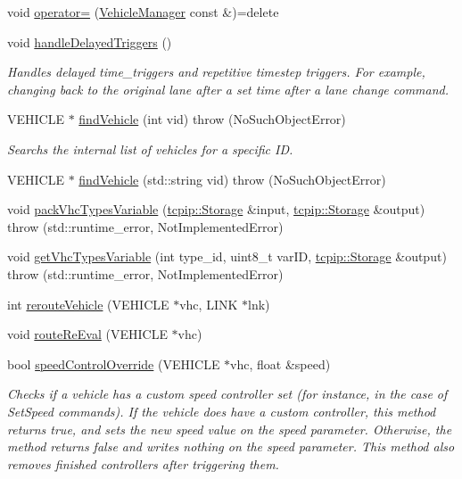 \begin{DoxyCompactItemize}
\item 
void \hyperlink{classtraci__api_1_1_vehicle_manager_a3e5ca16c51d63faee6a3a9eb3a4ffafa}{operator=} (\hyperlink{classtraci__api_1_1_vehicle_manager}{Vehicle\+Manager} const \&)=delete
\item 
void \hyperlink{classtraci__api_1_1_vehicle_manager_a4e656c9c9b434113e01331cf0b84babc}{handle\+Delayed\+Triggers} ()
\begin{DoxyCompactList}\small\item\em Handles delayed time\+\_\+triggers and repetitive timestep triggers. For example, changing back to the original lane after a set time after a lane change command. \end{DoxyCompactList}\item 
V\+E\+H\+I\+C\+LE $\ast$ \hyperlink{classtraci__api_1_1_vehicle_manager_a46fe50f2be4e9eb6df8f62b9a6e7aa53}{find\+Vehicle} (int vid)  throw (\+No\+Such\+Object\+Error)
\begin{DoxyCompactList}\small\item\em Searchs the internal list of vehicles for a specific ID. \end{DoxyCompactList}\item 
V\+E\+H\+I\+C\+LE $\ast$ \hyperlink{classtraci__api_1_1_vehicle_manager_a4fc72da33abd7a0323fd27c7721ba3ef}{find\+Vehicle} (std\+::string vid)  throw (\+No\+Such\+Object\+Error)
\item 
void \hyperlink{classtraci__api_1_1_vehicle_manager_abf96c7635d046d03bc02aa0cbc384d17}{pack\+Vhc\+Types\+Variable} (\hyperlink{classtcpip_1_1_storage}{tcpip\+::\+Storage} \&input, \hyperlink{classtcpip_1_1_storage}{tcpip\+::\+Storage} \&output)  throw (std\+::runtime\+\_\+error, Not\+Implemented\+Error)
\item 
void \hyperlink{classtraci__api_1_1_vehicle_manager_af404c1fa8e1459cbf415d1f4931c3ad6}{get\+Vhc\+Types\+Variable} (int type\+\_\+id, uint8\+\_\+t var\+ID, \hyperlink{classtcpip_1_1_storage}{tcpip\+::\+Storage} \&output)  throw (std\+::runtime\+\_\+error, Not\+Implemented\+Error)
\item 
int \hyperlink{classtraci__api_1_1_vehicle_manager_a47a471305d82ae97f65ac2c90f384baa}{reroute\+Vehicle} (V\+E\+H\+I\+C\+LE $\ast$vhc, L\+I\+NK $\ast$lnk)
\item 
void \hyperlink{classtraci__api_1_1_vehicle_manager_a02bcdc3429c0b027345148d9f5824554}{route\+Re\+Eval} (V\+E\+H\+I\+C\+LE $\ast$vhc)
\item 
bool \hyperlink{classtraci__api_1_1_vehicle_manager_acebd30eec75b857573c9237d9a15244f}{speed\+Control\+Override} (V\+E\+H\+I\+C\+LE $\ast$vhc, float \&speed)
\begin{DoxyCompactList}\small\item\em Checks if a vehicle has a custom speed controller set (for instance, in the case of Set\+Speed commands). If the vehicle does have a custom controller, this method returns true, and sets the new speed value on the speed parameter. Otherwise, the method returns false and writes nothing on the speed parameter. This method also removes finished controllers after triggering them. \end{DoxyCompactList}\end{DoxyCompactItemize}
